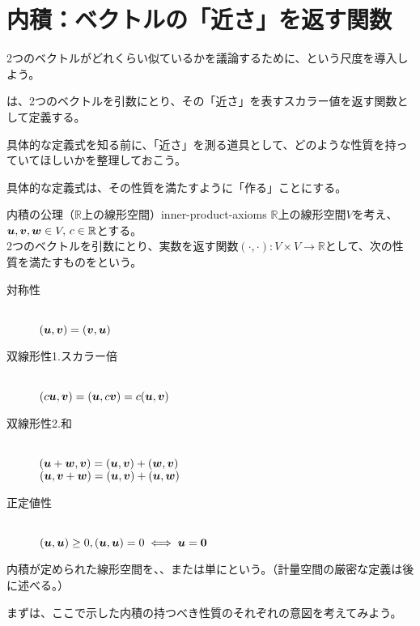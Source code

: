 \documentclass[../../../topic_linear-algebra]{subfiles}
\begin{document}
\sectionline
\section{内積：ベクトルの「近さ」を返す関数}

2つのベクトルがどれくらい似ているかを議論するために、という尺度を導入しよう。

\br

は、2つのベクトルを引数にとり、その「近さ」を表すスカラー値を返す関数として定義する。

\br

具体的な定義式を知る前に、「近さ」を測る道具として、どのような性質を持っていてほしいかを整理しておこう。

具体的な定義式は、その性質を満たすように「作る」ことにする。

\begin{definition}{内積の公理（$\mathbb{R}$上の線形空間）}{inner-product-axioms}
  $\mathbb{R}$上の線形空間$V$を考え、$\vb*{u}, \vb*{v}, \vb*{w} \in V,\, c \in \mathbb{R} $とする。\\
  2つのベクトルを引数にとり、実数を返す関数$(\cdot, \cdot): V \times V \to \mathbb{R}$として、次の性質を満たすものをという。
  \begin{description}
    \item[対称性]~\\
          $(\vb*{u}, \vb*{v}) = (\vb*{v}, \vb*{u})$
    \item[双線形性1.スカラー倍]~\\
          $(c\vb*{u}, \vb*{v}) = (\vb*{u}, c\vb*{v}) = c(\vb*{u}, \vb*{v})$
    \item[双線形性2.和]~\\
          $(\vb*{u} + \vb*{w}, \vb*{v}) = (\vb*{u}, \vb*{v}) + (\vb*{w}, \vb*{v})$\\
          $(\vb*{u}, \vb*{v} + \vb*{w}) = (\vb*{u}, \vb*{v}) + (\vb*{u}, \vb*{w})$
    \item[正定値性]~\\
          $(\vb*{u}, \vb*{u}) \geq 0, (\vb*{u}, \vb*{u}) = 0 \iff \vb*{u} = \vb*{0}$
  \end{description}
\end{definition}

内積が定められた線形空間を、、または単にという。（計量空間の厳密な定義は後に述べる。）

\br

まずは、ここで示した内積の持つべき性質のそれぞれの意図を考えてみよう。
\end{document}
